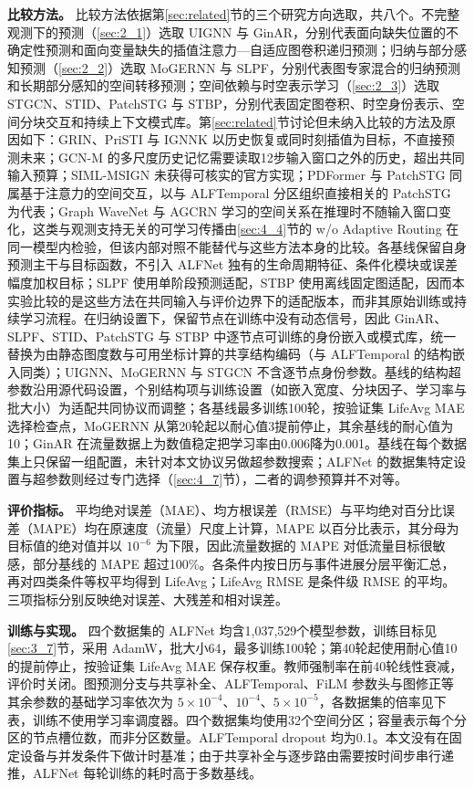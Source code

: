 \textbf{比较方法。} 比较方法依据第\ref{sec:related}节的三个研究方向选取，共八个。不完整观测下的预测（\ref{sec:2_1}）选取 UIGNN 与 GinAR，分别代表面向缺失位置的不确定性预测和面向变量缺失的插值注意力—自适应图卷积递归预测；归纳与部分感知预测（\ref{sec:2_2}）选取 MoGERNN 与 SLPF，分别代表图专家混合的归纳预测和长期部分感知的空间转移预测；空间依赖与时空表示学习（\ref{sec:2_3}）选取 STGCN、STID、PatchSTG 与 STBP，分别代表固定图卷积、时空身份表示、空间分块交互和持续上下文模式库。第\ref{sec:related}节讨论但未纳入比较的方法及原因如下：GRIN、PriSTI 与 IGNNK 以历史恢复或同时刻插值为目标，不直接预测未来；GCN-M 的多尺度历史记忆需要读取12步输入窗口之外的历史，超出共同输入预算；SIML-MSIGN 未获得可核实的官方实现；PDFormer 与 PatchSTG 同属基于注意力的空间交互，以与 ALFTemporal 分区组织直接相关的 PatchSTG 为代表；Graph WaveNet 与 AGCRN 学习的空间关系在推理时不随输入窗口变化，这类与观测支持无关的可学习传播由\ref{sec:4_4}节的 w/o Adaptive Routing 在同一模型内检验，但该内部对照不能替代与这些方法本身的比较。各基线保留自身预测主干与目标函数，不引入 ALFNet 独有的生命周期特征、条件化模块或误差幅度加权目标；SLPF 使用单阶段预测适配，STBP 使用离线固定图适配，因而本实验比较的是这些方法在共同输入与评价边界下的适配版本，而非其原始训练或持续学习流程。在归纳设置下，保留节点在训练中没有动态信号，因此 GinAR、SLPF、STID、PatchSTG 与 STBP 中逐节点可训练的身份嵌入或模式库，统一替换为由静态图度数与可用坐标计算的共享结构编码（与 ALFTemporal 的结构嵌入同类）；UIGNN、MoGERNN 与 STGCN 不含逐节点身份参数。基线的结构超参数沿用源代码设置，个别结构项与训练设置（如嵌入宽度、分块因子、学习率与批大小）为适配共同协议而调整；各基线最多训练100轮，按验证集 LifeAvg MAE 选择检查点，MoGERNN 从第20轮起以耐心值3提前停止，其余基线的耐心值为10；GinAR 在流量数据上为数值稳定把学习率由0.006降为0.001。基线在每个数据集上只保留一组配置，未针对本文协议另做超参数搜索；ALFNet 的数据集特定设置与超参数则经过专门选择（\ref{sec:4_7}节），二者的调参预算并不对等。

\textbf{评价指标。} 平均绝对误差（MAE）、均方根误差（RMSE）与平均绝对百分比误差（MAPE）均在原速度（流量）尺度上计算，MAPE 以百分比表示，其分母为目标值的绝对值并以 $10^{-6}$ 为下限，因此流量数据的 MAPE 对低流量目标很敏感，部分基线的 MAPE 超过100\%。各条件内按日历与事件进展分层平衡汇总，再对四类条件等权平均得到 LifeAvg；LifeAvg RMSE 是条件级 RMSE 的平均。三项指标分别反映绝对误差、大残差和相对误差。

\textbf{训练与实现。} 四个数据集的 ALFNet 均含1,037,529个模型参数，训练目标见\ref{sec:3_7}节，采用 AdamW，批大小64，最多训练100轮；第40轮起使用耐心值10的提前停止，按验证集 LifeAvg MAE 保存权重。教师强制率在前40轮线性衰减，评价时关闭。图预测分支与共享补全、ALFTemporal、FiLM 参数头与图修正等其余参数的基础学习率依次为 $5\times10^{-4}$、$10^{-4}$、$5\times10^{-5}$，各数据集的倍率见下表，训练不使用学习率调度器。四个数据集均使用32个空间分区；容量表示每个分区的节点槽位数，而非分区数量。ALFTemporal dropout 均为0.1。本文没有在固定设备与并发条件下做计时基准；由于共享补全与逐步路由需要按时间步串行递推，ALFNet 每轮训练的耗时高于多数基线。

